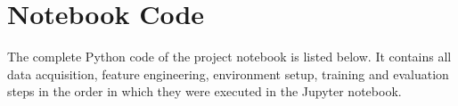 \section{Notebook Code}

The complete Python code of the project notebook is listed below. It contains all data
acquisition, feature engineering, environment setup, training and evaluation steps in the
order in which they were executed in the Jupyter notebook.


